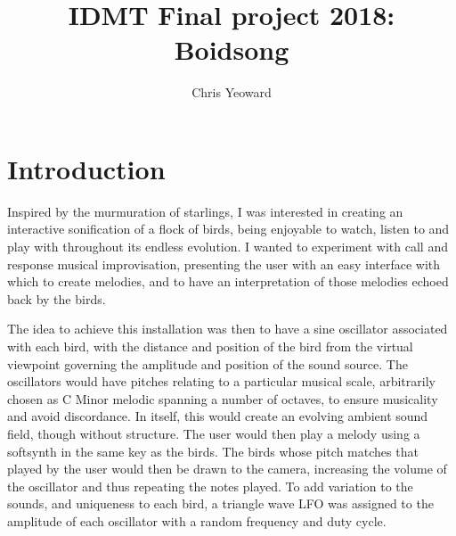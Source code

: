\documentclass[journal, a4paper]{IEEEtran}
\begin{document}
\title{IDMT Final project 2018: Boidsong}
\author{Chris Yeoward}
\maketitle

\section*{Introduction}
Inspired by the murmuration of starlings, I was interested in creating an interactive sonification of a flock of birds, being enjoyable to watch, listen to and play with throughout its endless evolution. I wanted to experiment with call and response musical improvisation, presenting the user with an easy interface with which to create melodies, and to have an interpretation of those melodies echoed back by the birds.

The idea to achieve this installation was then to have a sine oscillator associated with each bird, with the distance and position of the bird from the virtual viewpoint governing the amplitude and position of the sound source. The oscillators would have pitches relating to a particular musical scale, arbitrarily chosen as C Minor melodic spanning a number of octaves, to ensure musicality and avoid discordance. In itself, this would create an evolving ambient sound field, though without structure. The user would then play a melody using a softsynth in the same key as the birds. The birds whose pitch matches that played by the user would then be drawn to the camera, increasing the volume of the oscillator and thus repeating the notes played. To add variation to the sounds, and uniqueness to each bird, a triangle wave LFO was assigned to the amplitude of each oscillator with a random frequency and duty cycle.
\end{document}
